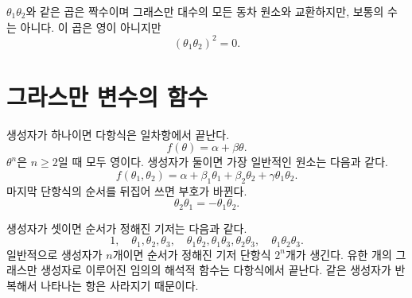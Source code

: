 \(\theta_1\theta_2\)와 같은 곱은 짝수이며 그래스만 대수의 모든 동차 원소와 교환하지만, 보통의 수는 아니다. 이 곱은 영이 아니지만
\begin{equation}
(\theta_1\theta_2)^2=0.
\end{equation}

\begin{classroomqa}
\end{classroomqa}

\section{그라스만 변수의 함수}

생성자가 하나이면 다항식은 일차항에서 끝난다.
\begin{equation}
f(\theta)=\alpha+\beta\theta.
\end{equation}
\(\theta^n\)은 \(n\geq2\)일 때 모두 영이다. 생성자가 둘이면 가장 일반적인 원소는 다음과 같다.
\begin{equation}
f(\theta_1,\theta_2)
=\alpha+\beta_1\theta_1+\beta_2\theta_2
+\gamma\theta_1\theta_2.
\end{equation}
마지막 단항식의 순서를 뒤집어 쓰면 부호가 바뀐다.
\begin{equation}
\theta_2\theta_1=-\theta_1\theta_2.
\end{equation}

\begin{classroomqa}
\end{classroomqa}

생성자가 셋이면 순서가 정해진 기저는 다음과 같다.
\begin{equation}
1,\quad
\theta_1,\theta_2,\theta_3,\quad
\theta_1\theta_2,\theta_1\theta_3,\theta_2\theta_3,\quad
\theta_1\theta_2\theta_3.
\end{equation}
일반적으로 생성자가 \(n\)개이면 순서가 정해진 기저 단항식 \(2^n\)개가 생긴다. 유한 개의 그래스만 생성자로 이루어진 임의의 해석적 함수는 다항식에서 끝난다. 같은 생성자가 반복해서 나타나는 항은 사라지기 때문이다. 

